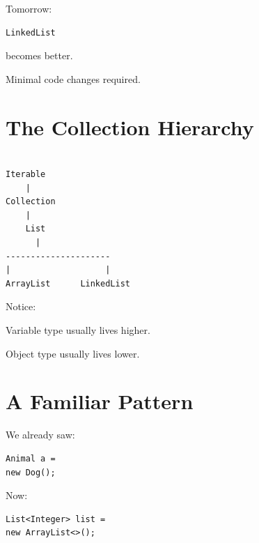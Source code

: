 \documentclass[11pt,a4paper]{book}
\begin{document}
Tomorrow:

\begin{verbatim} 
LinkedList
\end{verbatim}


becomes better.


Minimal code changes required.


\section{The Collection Hierarchy}

\begin{verbatim}

Iterable
    |
Collection
    |
    List
      |
---------------------
|                   |
ArrayList      LinkedList

\end{verbatim}


Notice:


Variable type usually lives higher.


Object type usually lives lower.


\section{A Familiar Pattern}

We already saw:

\begin{verbatim} 
Animal a =
new Dog();
\end{verbatim}


Now:

\begin{verbatim} 
List<Integer> list =
new ArrayList<>();
\end{verbatim}
\end{document}
